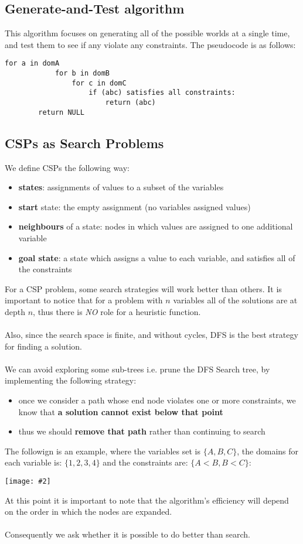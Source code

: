 \documentclass{article}
\def\blu#1{{\color{blu}#1}}
\theoremstyle{definition}
\newcommand{\centerfig}[2]{\begin{center}\texttt{[image: \#2]}\end{center}}
\begin{document}
\subsection*{Generate-and-Test algorithm}
This algorithm focuses on generating all of the possible worlds at a single time, and test them to see if any violate any constraints. The pseudocode is as follows:
\begin{lstlisting}[tabsize=3]
		for a in domA 
			for b in domB
				for c in domC
					if (abc) satisfies all constraints:
						return (abc)
		return NULL
\end{lstlisting}

\subsection*{CSPs as Search Problems}
We define CSPs the following way:
\begin{itemize}
	\item \textbf{\blu{states}}: assignments of values to a subset of the variables
	\item \textbf{\blu{start}} state: the empty assignment (no variables assigned values)
	\item \textbf{\blu{neighbours}} of a state: nodes in which values are assigned to one additional variable
	\item \textbf{\blu{goal state}}: a state which assigns a value to each variable, and satisfies all of the constraints
\end{itemize}
For a CSP problem, some search strategies will work better than others. It is important to notice that for a problem with $ n $ variables all of the solutions are at depth $ n $, thus there is \textsl{NO} role for a heuristic function. \\ \\
Also, since the search space is finite, and without cycles, DFS is the best strategy for finding a solution. \\ \\
We can avoid exploring some sub-trees i.e. prune the DFS Search tree, by implementing the following strategy:
\begin{itemize}
	\item once we consider a path whose end node violates one or more constraints, we know that \textbf{\blu{a solution cannot exist below that point}}
	\item thus we should \textbf{\blu{remove that path}} rather than continuing to search
\end{itemize}
The followign is an example, where the variables set is $ \{A, B, C\} $, the domains for each variable is: $ \{1, 2, 3, 4\} $ and the constraints are: $ \{ A < B, B<C\} $:
\centerfig{0.6}{ex_csp1}
At this point it is important to note that the algorithm's efficiency will depend on the order in which the nodes are expanded. \\ \\
Consequently we ask whether it is possible to do better than search. 
\end{document}
